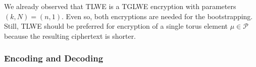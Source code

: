 \documentclass{article}
\newcommand{\Pcal}{\mathcal{P}}
\theoremstyle{definition}
\theoremstyle{Theorem}
\begin{document}

We already observed that TLWE is a TGLWE encryption with parameters $(k, N) = (n, 1)$. Even so, both encryptions are needed for the bootstrapping. Still, TLWE should be preferred for encryption of a single torus element $\mu \in \Pcal$ because the resulting ciphertext is shorter.


\subsubsection{Encoding and Decoding}
\end{document}
